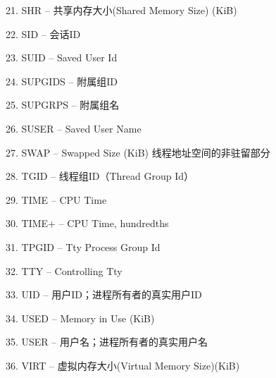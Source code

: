 
21. SHR  --  共享内存大小(Shared Memory Size) (KiB)   \par
{}

22. SID  -- 会话ID \par

23. SUID  --  Saved User Id \par

24. SUPGIDS  --  附属组ID    \par

25. SUPGRPS  --  附属组名  \par

26. SUSER  --  Saved User Name  \par

27. SWAP  --  Swapped Size (KiB)  线程地址空间的非驻留部分  \par

28. TGID  --  线程组ID（Thread Group Id） \par
{}

29. TIME  --  CPU Time  \par
{}

30. TIME+  --  CPU Time, hundredths \par
{}

31. TPGID  --  Tty Process Group Id \par

32. TTY  --  Controlling Tty    \par

33. UID  --  用户ID；进程所有者的真实用户ID   \par

34. USED  --  Memory in Use (KiB)   \par
{}

35. USER  --  用户名；进程所有者的真实用户名  \par

36. VIRT  --  虚拟内存大小(Virtual Memory Size)(KiB) \par
{}

